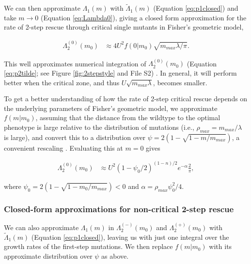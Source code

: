 \documentclass[9pt,twocolumn,twoside,lineno]{gsajnl}
\begin{document}
\noindent We can then approximate $\Lambda_1(m)$ with $\tilde{\Lambda}_1(m)$ (Equation \ref{eq:p1closed}) and take $m\rightarrow0$ (Equation \ref{eq:Lambda0}), giving a closed form approximation for the rate of 2-step rescue through critical single mutants in Fisher's geometric model,

\begin{equation}\label{eq:p20app}
\begin{aligned}
\Lambda_2^{(0)}(m_0)
&\approx 4 U^2 f(0|m_0)  \sqrt{m_{max} \lambda/ \pi}.
\end{aligned}
\end{equation}

\noindent This well approximates numerical integration of $\Lambda_2^{(0)}(m_0)$  (Equation \ref{eq:p2tilde}; see Figure \ref{fig:2stepstyle} and File S2) .
In general, it will perform better when the critical zone, and thus $U \sqrt{m_{max} \lambda}$, becomes smaller.

To get a better understanding of how the rate of 2-step critical rescue depends on the underlying parameters of Fisher's geometric model, we approximate $f(m|m_0)$, assuming that the distance from the wildtype to the optimal phenotype is large relative to the distribution of mutations (i.e., $\rho_{max} = m_{max}/\lambda$ is large), and convert this to a distribution over $\psi = 2(1-\sqrt{1-m/m_{max}})$, a convenient rescaling \citep[for details see File S2 and][]{Anciaux2018}.
Evaluating this at $m=0$ gives

\begin{equation}\label{eq:p20app2}
\begin{aligned}
\Lambda_2^{(0)}(m_0)
&\approx U^2 (1-\psi_0/2)^{(1-n)/2} e^{-\alpha} \frac{2}{\pi},
\end{aligned}
\end{equation}

\noindent where $\psi_0 = 2(1-\sqrt{1-m_0/m_{max}})<0$ and $\alpha = \rho_{max} \psi_0^2/4$.

\subsubsection{Closed-form approximations for non-critical 2-step rescue}

We can also approximate $\Lambda_1(m)$ in $\Lambda_2^{(-)}(m_0)$ and $\Lambda_2^{(+)}(m_0)$ with $\tilde{\Lambda}_1(m)$ (Equation \ref{eq:p1closed}), leaving us with just one integral over the growth rates of the first-step mutations.
We then replace $f(m|m_0)$ with its approximate distribution over $\psi$ as above.
\end{document}
